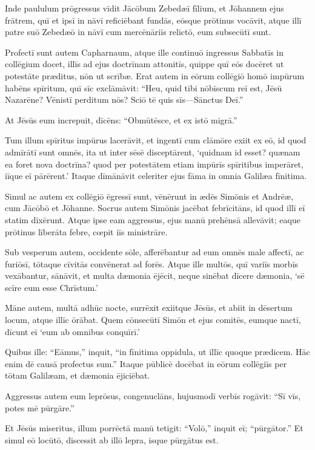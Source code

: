 \Versus Inde paululum prōgressus vīdit Jācōbum Zebedæī fīlium, et Jōhannem ejus frātrem, quī et ipsī in nāvī reficiēbant fundās,
\Versus eōsque prōtinus vocāvit, atque illī patre suō Zebedæō in nāvī cum mercēnāriīs relictō, eum subsecūtī sunt.

\Versus Profectī sunt autem Capharnaum, atque ille continuō ingressus Sabbatīs in collēgium docet,
\Versus illīs ad ejus doctrīnam attonitīs, quippe quī eōs docēret ut potestāte præditus, nōn ut scrībæ.
\Versus Erat autem in eōrum collēgiō homō impūrum habēns spīritum, quī sīc exclāmāvit:
\Versus ``Heu, quid tibi nōbīscum reī est, Jēsū Nazarēne? Vēnistī perditum nōs? Sciō tē quis sīs—Sānctus Deī.''

\Versus At Jēsūs eum increpuit, dīcēns: ``Obmūtēsce, et ex istō migrā.''

\Versus Tum illum spīritus impūrus lacerāvit, et ingentī cum clāmōre exiit ex eō,
\Versus id quod admīrātī sunt omnēs, ita ut inter sēsē disceptārent, `quidnam id esset? quænam ea foret nova doctrīna? quod per potestātem etiam impūrīs spīritibus imperāret, iīque eī pārērent.'
\Versus Itaque dīmānāvit celeriter ejus fāma in omnia Galilæa fīnitima.

\Versus Simul ac autem ex collēgiō ēgressī sunt, vēnērunt in ædēs Simōnis et Andrēæ, cum Jācōbō et Jōhanne.
\Versus Socrus autem Simōnis jacēbat febrīcitāns, id quod illī eī statim dīxērunt.
\Versus Atque ipse eam aggressus, ejus manū prehēnsā allevāvit; eaque prōtinus līberāta febre, cœpit iīs ministrāre.

\Versus Sub vesperum autem, occidente sōle, afferēbantur ad eum omnēs male affectī, ac furiōsī,
\Versus tōtaque cīvitās convēnerat ad forēs.
\Versus Atque ille multōs, quī variīs morbīs vexābantur, sānāvit, et multa dæmonia ējēcit, neque sinēbat dīcere dæmonia, `sē scīre eum esse Chrīstum.'

\Versus Māne autem, multā adhūc nocte, surrēxit exiitque Jēsūs, et abiit in dēsertum locum, atque illīc ōrābat.
\Versus Quem cōnsecūtī Simōn et ejus comitēs,
\Versus eumque nactī, dīcunt eī `eum ab omnibus conquīrī.'

\Versus Quibus ille: ``Eāmus,'' inquit, ``in fīnitima oppidula, ut illīc quoque prædicem. Hāc enim dē causā profectus sum.''
\Versus Itaque pūblicē docēbat in eōrum collēgiīs per tōtam Galilæam, et dæmonia ējiciēbat.

\Versus Aggressus autem eum leprōsus, congenuclāns, hujusmodī verbīs rogāvit: ``Sī vīs, potes mē pūrgāre.''

\Versus Et Jēsūs miseritus, illum porrēctā manū tetigit: ``Volō,'' inquit eī; ``pūrgātor.''
\Versus Et simul eō locūtō, discessit ab illō lepra, isque pūrgātus est.

